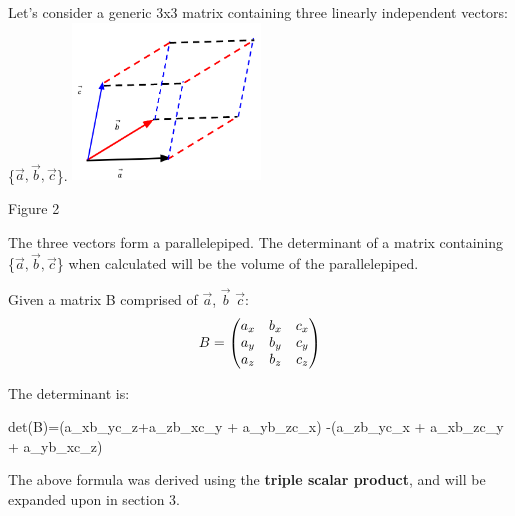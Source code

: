 \documentclass{article}
\begin{document}
	\hspace{0.75cm}
	\begin{minipage}[c]{.45\linewidth}
		\par \noindent  Let's consider a generic 3x3 matrix containing three linearly independent vectors: \{\(\vec a, \vec b, \vec c\)\}.
		\newline
		\includegraphics[width=5cm]{det-geo2.png}
		\begin{center}Figure 2\end{center}
		\par \noindent The three vectors form a parallelepiped. The determinant of a matrix containing \{\(\vec a, \vec b, \vec c\)\} when calculated will be the volume of the parallelepiped. 
		\newline
		\par\noindent Given a matrix B comprised of \(\vec a\), \(\vec b\) \(\vec c\):
		 \[B=
		 \left(\begin{array}{@{}ccc@{}}
		 	a_x & b_x & c_x \\ 
		 	a_y &  b_y & c_y \\
		 	a_z &  b_z & c_z \\
		 \end{array}\right)
		 \]
		\par \noindent The determinant is:
		\begin{flalign*}
		det(B)=(a_xb_yc_z+a_zb_xc_y + a_yb_zc_x) -(a_zb_yc_x + a_xb_zc_y + a_yb_xc_z)
		\end{flalign*}
		\par \noindent The above formula was derived using the \textbf{triple scalar product}, and will be expanded upon in section 3.
		 \(\)
	\end{minipage}
\newpage
\end{document}
